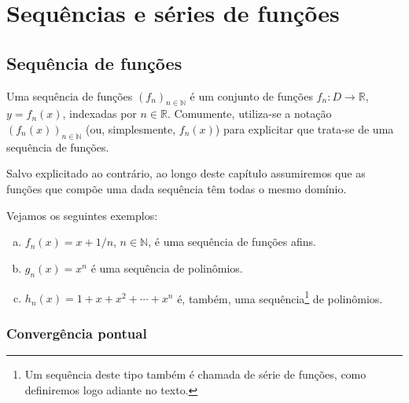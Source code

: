 
\chapter{Sequências e séries de funções}\label{c_ssf}
\thispagestyle{fancy}

\section{Sequência de funções}\label{c_ssf_s_sf}

\begin{defn}
  Uma sequência de funções $(f_n)_{n\in\mathbb{N}}$ é um conjunto de funções $f_n:D\to\mathbb{R}$, $y=f_n(x)$, indexadas por $n\in\mathbb{R}$. Comumente, utiliza-se a notação $(f_n(x))_{n\in\mathbb{N}}$ (ou, simplesmente, $f_n(x)$) para explicitar que trata-se de uma sequência de funções.
\end{defn}

\begin{obs}
  Salvo explicitado ao contrário, ao longo deste capítulo assumiremos que as funções que compõe uma dada sequência têm todas o mesmo domínio.
\end{obs}

\begin{ex}
  Vejamos os seguintes exemplos:
  \begin{enumerate}[a)]
  \item $f_n(x) = x+1/n$, $n\in\mathbb{N}$, é uma sequência de funções afins.
  \item $g_n(x) = x^n$ é uma sequência de polinômios.
  \item $h_n(x) = 1 + x + x^2 + \cdots + x^n$ é, também, uma sequência\footnote{Um sequência deste tipo também é chamada de série de funções, como definiremos logo adiante no texto.} de polinômios.
  \end{enumerate}
\end{ex}

\subsection{Convergência pontual}

